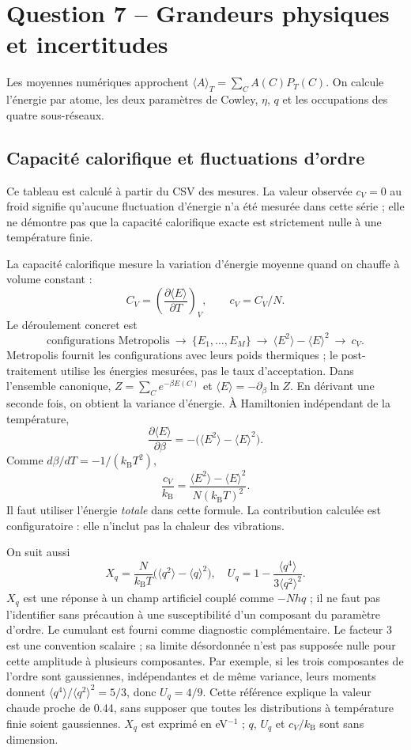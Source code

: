 \documentclass[10pt,a4paper]{article}
\newcommand{\kb}{k_{\mathrm B}}
\begin{document}
\section{Question 7 -- Grandeurs physiques et incertitudes}
Les moyennes numériques approchent
$\langle A\rangle_T=\sum_C A(C)P_T(C)$. On calcule l'énergie par atome,
les deux paramètres de Cowley, $\eta$, $q$ et les occupations des quatre
sous-réseaux.

\subsection{Capacité calorifique et fluctuations d'ordre}

Ce tableau est calculé à partir du CSV des mesures. La valeur observée
$c_V=0$ au froid signifie qu'aucune fluctuation d'énergie n'a été mesurée
dans cette série ; elle ne démontre pas que la capacité calorifique exacte
est strictement nulle à une température finie.

La capacité calorifique mesure la variation d'énergie moyenne quand on
chauffe à volume constant :
\[
C_V=\left(\frac{\partial\langle E\rangle}{\partial T}\right)_V,
\qquad c_V=C_V/N.
\]
Le déroulement concret est
\[
\text{configurations Metropolis}\ \longrightarrow\
\{E_1,\ldots,E_M\}\ \longrightarrow\
\langle E^2\rangle-\langle E\rangle^2\ \longrightarrow\ c_V.
\]
Metropolis fournit les configurations avec leurs poids thermiques ; le
post-traitement utilise les énergies mesurées, pas le taux d'acceptation.
Dans l'ensemble canonique,
$Z=\sum_C e^{-\beta E(C)}$ et $\langle E\rangle=-\partial_\beta\ln Z$.
En dérivant une seconde fois, on obtient la variance d'énergie.
À Hamiltonien indépendant de la température,
\[
\frac{\partial\langle E\rangle}{\partial\beta}
=-\big(\langle E^2\rangle-\langle E\rangle^2\big).
\]
Comme $d\beta/dT=-1/(\kb T^2)$,
\begin{equation}
\boxed{\frac{c_V}{\kb}=
\frac{\langle E^2\rangle-\langle E\rangle^2}{N(\kb T)^2}.}
\end{equation}
Il faut utiliser l'énergie \emph{totale} dans cette formule. La contribution
calculée est configuratoire : elle n'inclut pas la chaleur des vibrations.

On suit aussi
\[
X_q=\frac{N}{\kb T}\big(\langle q^2\rangle-\langle q\rangle^2\big),
\quad
U_q=1-\frac{\langle q^4\rangle}{3\langle q^2\rangle^2}.
\]
$X_q$ est une réponse à un champ artificiel couplé comme $-Nhq$ ; il ne
faut pas l'identifier sans précaution à une susceptibilité d'un composant
du paramètre d'ordre. Le cumulant est fourni comme diagnostic complémentaire.
Le facteur $3$ est une convention scalaire ; sa limite désordonnée n'est
pas supposée nulle pour cette amplitude à plusieurs composantes.
Par exemple, si les trois composantes de l'ordre sont gaussiennes,
indépendantes et de même variance, leurs moments donnent
$\langle q^4\rangle/\langle q^2\rangle^2=5/3$, donc $U_q=4/9$.
Cette référence explique la valeur chaude proche de 0.44, sans supposer
que toutes les distributions à température finie soient gaussiennes.
$X_q$ est exprimé en eV$^{-1}$ ; $q$, $U_q$ et $c_V/\kb$ sont sans dimension.
\end{document}
